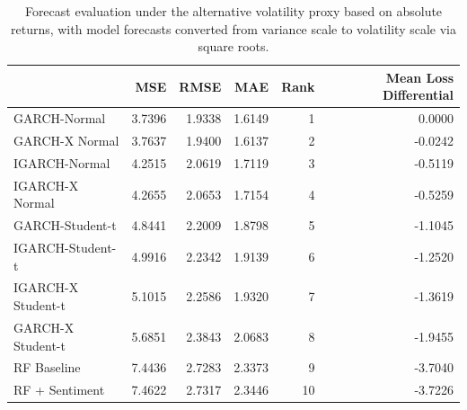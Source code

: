 \begin{table}
\caption{Forecast evaluation under the alternative volatility proxy based on absolute returns, with model forecasts converted from variance scale to volatility scale via square roots.}
\label{tab:robustness_absolute_proxy}
\begin{tabular}{lrrrrr}
\toprule
 & MSE & RMSE & MAE & Rank & Mean Loss Differential \\
\midrule
GARCH-Normal & 3.7396 & 1.9338 & 1.6149 & 1 & 0.0000 \\
GARCH-X Normal & 3.7637 & 1.9400 & 1.6137 & 2 & -0.0242 \\
IGARCH-Normal & 4.2515 & 2.0619 & 1.7119 & 3 & -0.5119 \\
IGARCH-X Normal & 4.2655 & 2.0653 & 1.7154 & 4 & -0.5259 \\
GARCH-Student-t & 4.8441 & 2.2009 & 1.8798 & 5 & -1.1045 \\
IGARCH-Student-t & 4.9916 & 2.2342 & 1.9139 & 6 & -1.2520 \\
IGARCH-X Student-t & 5.1015 & 2.2586 & 1.9320 & 7 & -1.3619 \\
GARCH-X Student-t & 5.6851 & 2.3843 & 2.0683 & 8 & -1.9455 \\
RF Baseline & 7.4436 & 2.7283 & 2.3373 & 9 & -3.7040 \\
RF + Sentiment & 7.4622 & 2.7317 & 2.3446 & 10 & -3.7226 \\
\bottomrule
\end{tabular}
\end{table}
